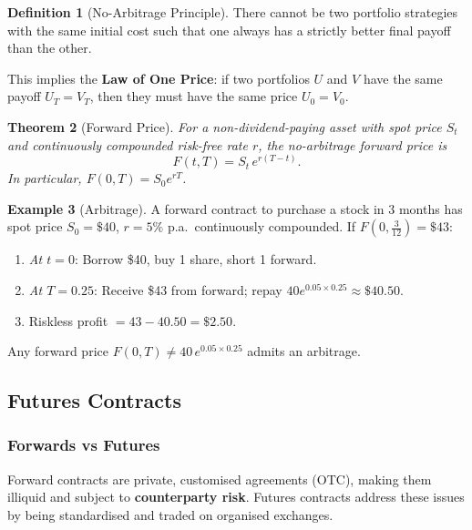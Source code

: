 \documentclass[12pt, a4paper]{article}
\theoremstyle{plain}
\newtheorem{theorem}{Theorem}[section]
\theoremstyle{definition}
\newtheorem{definition}[theorem]{Definition}
\newtheorem{example}[theorem]{Example}
\theoremstyle{remark}
\begin{document}
\begin{definition}[No-Arbitrage Principle]
  There cannot be two portfolio strategies with the same initial cost such that one always has a strictly better final payoff than the other.

  \medskip \noindent This implies the \textbf{Law of One Price}: if two portfolios $U$ and $V$ have the same payoff $U_T = V_T$, then they must have the same price $U_0 = V_0$.
\end{definition}

\begin{theorem}[Forward Price]
  For a non-dividend-paying asset with spot price $S_t$ and continuously compounded risk-free rate $r$, the no-arbitrage forward price is
  \[
    F(t,T) = S_t \, e^{r(T-t)}.
  \]
  In particular, $F(0,T) = S_0 e^{rT}$.
\end{theorem}

\begin{example}[Arbitrage]
  A forward contract to purchase a stock in 3 months has spot price $S_0 = \$40$, $r = 5\%$ p.a.\ continuously compounded. If $F(0, \tfrac{3}{12}) = \$43$:
  \begin{enumerate}
    \item \emph{At $t=0$}: Borrow \$40, buy 1 share, short 1 forward.
    \item \emph{At $T=0.25$}: Receive \$43 from forward; repay $40 e^{0.05 \times 0.25} \approx \$40.50$.
    \item Riskless profit $= 43 - 40.50 = \$2.50$.
  \end{enumerate}
  Any forward price $F(0,T) \neq 40\,e^{0.05 \times 0.25}$ admits an arbitrage.
\end{example}

\subsection{Futures Contracts}

\subsubsection*{Forwards vs Futures}

Forward contracts are private, customised agreements (OTC), making them illiquid and subject to \textbf{counterparty risk}. Futures contracts address these issues by being standardised and traded on organised exchanges.
\end{document}
